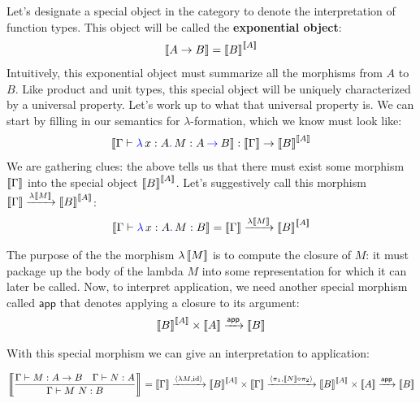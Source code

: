 Let's designate a special object in the category 
to denote the interpretation of function types. This object 
will be called the \textbf{exponential object}:
\begin{align}
  \left\llbracket A \to B \right\rrbracket = \left\llbracket B \right\rrbracket^{\left\llbracket A \right\rrbracket}
\end{align}
Intuitively, this exponential object must summarize all the morphisms from $A$ 
to $B$.
Like product and unit types, this special object will be uniquely characterized 
by a universal property. Let's work up to what that universal property is.
We can start by filling in our semantics for $\lambda$-formation, 
which we know must look like:
\begin{align}
  \left\llbracket \Gamma \vdash {\color{blue}\lambda}\,x : A{\color{blue}.}\,M : {A \mathbin{{\color{blue}\to}} B} \right\rrbracket : \left\llbracket \Gamma \right\rrbracket \to \left\llbracket B \right\rrbracket^{\left\llbracket A \right\rrbracket}
\end{align}
We are gathering clues: the above tells us that there must exist some 
morphism $\left\llbracket \Gamma \right\rrbracket$ into the special object $\left\llbracket B \right\rrbracket^{\left\llbracket A \right\rrbracket}$. 
Let's suggestively call this morphism $\left\llbracket \Gamma \right\rrbracket \xrightarrow{\lambda \left\llbracket M \right\rrbracket} \left\llbracket B \right\rrbracket^{\left\llbracket A \right\rrbracket}$:
\begin{align}
  \left\llbracket \Gamma \vdash {\color{blue}\lambda}\,x : A{\color{blue}.}\,M : B \right\rrbracket = \left\llbracket \Gamma \right\rrbracket \xrightarrow{\lambda \left\llbracket M \right\rrbracket} 
  \left\llbracket B \right\rrbracket^{\left\llbracket A \right\rrbracket}
\end{align}

\newcommand\app{\mathsf{app}}
\newcommand\lam{\lambda}

The purpose of the the morphism $\lambda \left\llbracket M \right\rrbracket$ is to compute the closure
of $M$: it must package up the body of the lambda $M$ into some representation
for which it can later be called. Now, to interpret application, 
we need another special morphism called $\app{}$ that denotes applying a closure 
to its argument:
\begin{align}
  \dbracket{B}^{\dbracket{A}} \times \dbracket{A} \mor{\app{}} \dbracket{B}
\end{align}

With this special morphism we can give an interpretation to application: 
\begin{fullwidth}
\begin{align}
  \dbracket{\dfrac{\Gamma \vdash M : A \to B \quad \Gamma \vdash N : A}{\Gamma \vdash M~N : B}}
  = \dbracket{\Gamma} \mor{\langle \lambda M, \id \rangle} \dbracket{B}^{\dbracket{A}} \times \dbracket{\Gamma}
  \mor{\langle \pi_1, \dbracket{N} \circ\pi_2\rangle } \dbracket{B}^{\dbracket{A}} \times \dbracket{A}
  \mor{\app{}} \dbracket{B}
\end{align}
\end{fullwidth}

